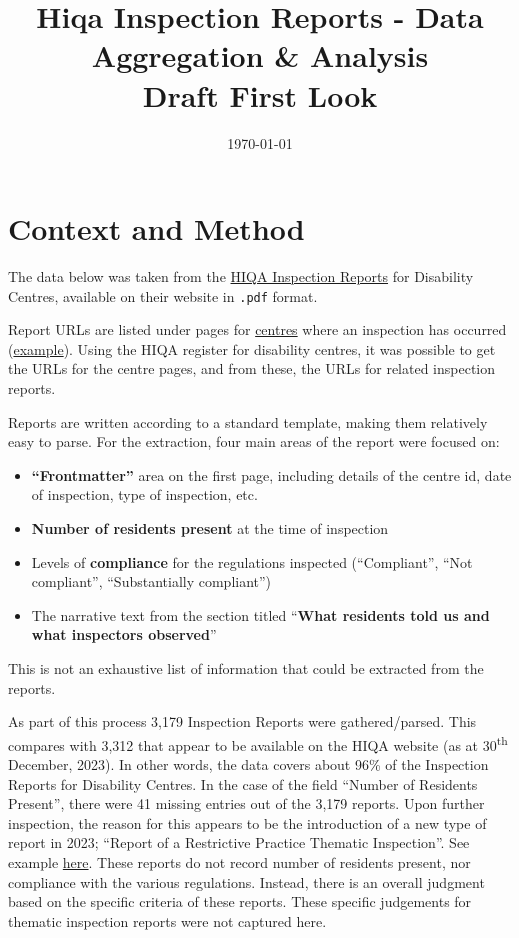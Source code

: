 \documentclass[a4paper,11pt,twoside]{article}
\date{\today}
\title{Hiqa Inspection Reports - Data Aggregation \& Analysis\\\medskip
\large Draft First Look}
\begin{document}
\maketitle
\tableofcontents

\clearpage
\section{Context and Method}
\label{sec:org4965794}
The data below was taken from the \href{https://www.hiqa.ie/reports-and-publications/inspection-reports}{HIQA Inspection Reports} for Disability Centres, available on their website in \texttt{.pdf} format.

Report URLs are listed under pages for \href{https://www.hiqa.ie/find-a-centre}{centres} where an inspection has occurred (\href{https://www.hiqa.ie/areas-we-work/find-a-centre/st-dominics-services}{example}). Using the HIQA register for disability centres, it was possible to get the URLs for the centre pages, and from these, the URLs for related inspection  reports.

Reports are written according to a standard template, making them relatively easy to parse. For the extraction, four main areas of the report were focused on:

\begin{itemize}
\item \textbf{``Frontmatter''} area on the first page, including details of the centre id, date of inspection, type of inspection, etc.
\item \textbf{Number of residents present} at the time of inspection
\item Levels of \textbf{compliance} for the regulations inspected (``Compliant'', ``Not compliant'', ``Substantially compliant'')
\item The narrative text from the section titled ``\textbf{What residents told us and what inspectors observed}''
\end{itemize}

This is not an exhaustive list of information that could be extracted from the reports.

As part of this process 3,179 Inspection Reports were gathered/parsed. This compares with 3,312 that appear to be available on the HIQA website (as at 30\textsuperscript{th} December, 2023). In other words, the data covers about 96\% of the Inspection Reports for Disability Centres. In the case of the field ``Number of Residents Present'', there were 41 missing entries out of the 3,179 reports. Upon further inspection, the reason for this appears to be the introduction of a new type of report in 2023; ``Report of a Restrictive Practice Thematic Inspection''. See example \href{https://www.hiqa.ie/system/files?file=inspectionreports/5654-an-diadan-26-september-2023.pdf}{here}. These reports do not record number of residents present, nor compliance with the various regulations. Instead, there is an overall judgment based on the specific criteria of these reports. These specific judgements for thematic inspection reports were not captured here.
\end{document}
